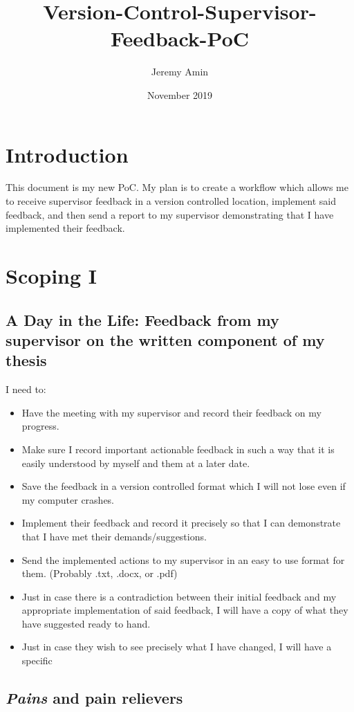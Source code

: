\documentclass{article}
\title{Version-Control-Supervisor-Feedback-PoC}
\author{Jeremy Amin}
\date{November 2019}
\begin{document}
\maketitle
\tableofcontents

\section{Introduction}

This document is my new PoC. My plan is to create a workflow which allows me to receive supervisor feedback in a version controlled location, implement said feedback, and then send a report to my supervisor demonstrating that I have implemented their feedback.

\section{Scoping I}

\subsection{A Day in the Life: Feedback from my supervisor on the written component of my thesis}

I need to:
\begin{itemize}
    \item Have the meeting with my supervisor and record their feedback on my progress.
    \item Make sure I record important actionable feedback in such a way that it is easily understood by myself and them at a later date.
    \item Save the feedback in a version controlled format which I will not lose even if my computer crashes.
    \item Implement their feedback and record it precisely so that I can demonstrate that I have met their demands/suggestions.
    \item Send the implemented actions to my supervisor in an easy to use format for them. (Probably .txt, .docx, or .pdf)
    \item Just in case there is a contradiction between their initial feedback and my appropriate implementation of said feedback, I will have a copy of what they have suggested ready to hand.
    \item Just in case they wish to see precisely what I have changed, I will have a specific 
\end{itemize}

\subsection{\textit {Pains} and pain relievers}
\end{document}
